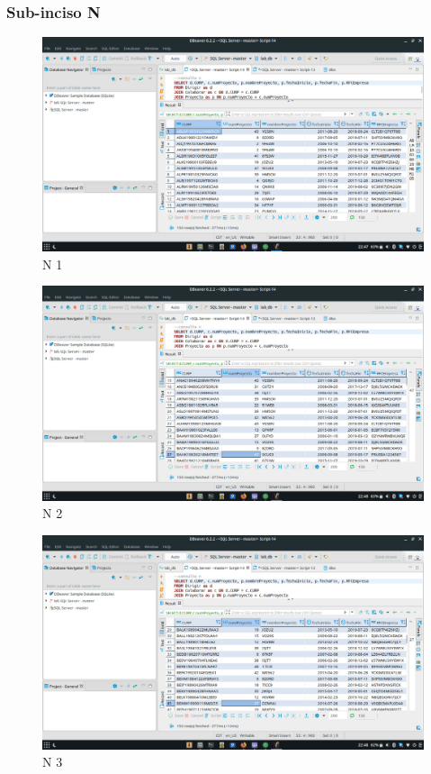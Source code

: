 \documentclass[a4paper, 12pt]{report}
\begin{document}
\subsubsection*{Sub-inciso N}
    \begin{figure}
        \includegraphics[width=\textwidth]
            {img/n1.jpeg}\hfill
    \caption{N 1}
    \end{figure}
    \begin{figure}
        \includegraphics[width=\textwidth]
            {img/n2.jpeg}\hfill
    \caption{N 2}
    \end{figure}
    \begin{figure}
        \includegraphics[width=\textwidth]
            {img/n3.jpeg}\hfill
    \caption{N 3}
    \end{figure}
\end{document}

